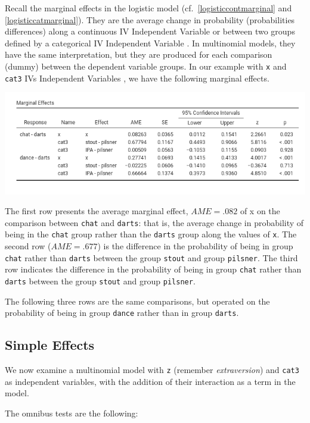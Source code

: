 \documentclass[
]{book}
\begin{document}
Recall the marginal effects in the logistic model (cf.~\ref{logisticcontmarginal} and \ref{logisticcatmarginal}). They are the average change in probability (probabilities differences) along a continuous {IV {Independent Variable} } or between two groups defined by a categorical {IV {Independent Variable} }. In multinomial models, they have the same interpretation, but they are produced for each comparison (dummy) between the dependent variable groups. In our example with \texttt{x} and \texttt{cat3} {IVs {Independent Variables} }, we have the following marginal effects.

\includegraphics[width=9.68in]{bookletpics/3_multi_output7}

The first row presents the average marginal effect, \(AME=.082\) of x on the comparison between \texttt{chat} and \texttt{darts}: that is, the average change in probability of being in the \texttt{chat} group rather than the \texttt{darts} group along the values of \texttt{x}. The second row (\(AME=.677\)) is the difference in the probability of being in group \texttt{chat} rather than \texttt{darts} between the group \texttt{stout} and group \texttt{pilsner}. The third row indicates the difference in the probability of being in group \texttt{chat} rather than \texttt{darts} between the group \texttt{stout} and group \texttt{pilsner}.

The following three rows are the same comparisons, but operated on the probability of being in group \texttt{dance} rather than in group \texttt{darts}.

\hypertarget{simple-effects-1}{%
\subsection{Simple Effects}\label{simple-effects-1}}

We now examine a multinomial model with \texttt{z} (remember \emph{extraversion}) and \texttt{cat3} as independent variables, with the addition of their interaction as a term in the model.

The omnibus tests are the following:
\end{document}
